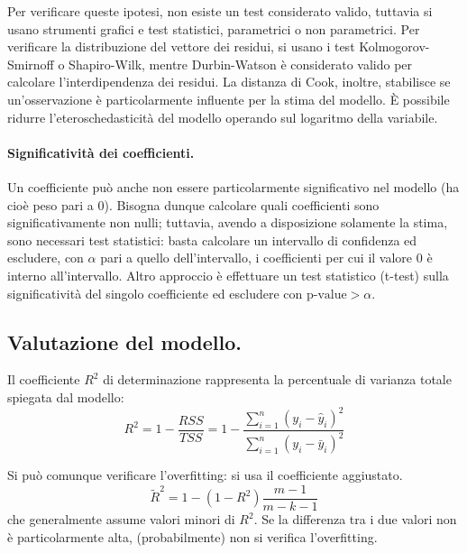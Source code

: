 \documentclass[11pt, a4page, twocolumn]{article}
\begin{document}
Per verificare queste ipotesi, non esiste un test considerato valido, tuttavia si usano strumenti grafici e test statistici, parametrici o non parametrici. \newline
Per verificare la distribuzione del vettore dei residui, si usano i test Kolmogorov-Smirnoff o Shapiro-Wilk, mentre Durbin-Watson è considerato valido per calcolare l'interdipendenza dei residui.
La distanza di Cook, inoltre, stabilisce se un'osservazione è particolarmente influente per la stima del modello. \newline
È possibile ridurre l'eteroschedasticità del modello operando sul logaritmo della variabile. \newline

\paragraph{Significatività dei coefficienti.}
Un coefficiente può anche non essere particolarmente significativo nel modello (ha cioè peso pari a $0$).
Bisogna dunque calcolare quali coefficienti sono significativamente non nulli; tuttavia, avendo a disposizione solamente la stima, sono necessari test statistici: basta calcolare un intervallo di confidenza ed escludere, con $ \alpha$ pari a quello dell'intervallo, i coefficienti per cui il valore $0$ è interno all'intervallo.
Altro approccio è effettuare un test statistico (t-test) sulla significatività del singolo coefficiente ed escludere con $\text{p-value} > \alpha$.

\subsection{Valutazione del modello.}
Il coefficiente $R^2$ di determinazione rappresenta la percentuale di varianza totale spiegata dal modello:
\begin{equation*}
  R^2 = 1 - \frac{RSS}{TSS} = 1 - \frac{\sum^n_{i=1}{(y_i - \hat{y}_i)^2}}{\sum^n_{i=1}{(y_i - \bar{y}_i)^2}}
\end{equation*}

Si può comunque verificare l'overfitting: si usa il coefficiente aggiustato.
\begin{equation*}
  \tilde{R}^2 = 1 - (1 - R^2)\frac{m-1}{m-k-1}
\end{equation*}
che generalmente assume valori minori di $R^2$.
Se la differenza tra i due valori non è particolarmente alta, (probabilmente) non si verifica l'overfitting. \newline
\end{document}
